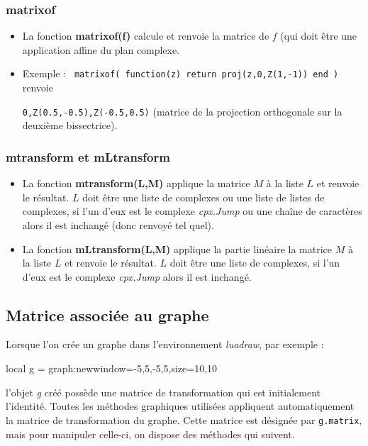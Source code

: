 \subsubsection{matrixof}
\begin{itemize}
    \item La fonction \textbf{matrixof(f)} calcule et renvoie la matrice de $f$ (qui doit être une application affine du plan complexe.
    \item Exemple : \texttt{ matrixof( function(z) return proj(z,{0,Z(1,-1)}) end )} renvoie \par
     \texttt{{0,Z(0.5,-0.5),Z(-0.5,0.5)}} (matrice de la projection orthogonale sur la deuxième bissectrice).
\end{itemize}

\subsubsection{mtransform et mLtransform}
\begin{itemize}
    \item La fonction \textbf{mtransform(L,M)} applique la matrice $M$ à la liste $L$ et renvoie le résultat. $L$ doit être une liste de complexes ou une liste de listes de complexes, si l'un d'eux est le complexe \emph{cpx.Jump} ou une chaîne de caractères alors il est inchangé (donc renvoyé tel quel).
    \item La fonction \textbf{mLtransform(L,M)} applique la partie linéaire la matrice $M$ à la liste $L$ et renvoie le résultat. $L$ doit être une liste de complexes, si l'un d'eux est le complexe \emph{cpx.Jump} alors il est inchangé.
\end{itemize}

\subsection{Matrice associée au graphe}

Lorsque l'on crée un graphe dans l'environnement \emph{luadraw}, par exemple :
\begin{Luacode}
local g = graph:new{window={-5,5,-5,5},size={10,10}}
\end{Luacode}
l'objet \emph{g} créé possède une matrice de transformation qui est initialement l'identité. Toutes les méthodes graphiques utilisées appliquent automatiquement la matrice de transformation du graphe. Cette matrice est désignée par \texttt{g.matrix}, mais pour manipuler celle-ci, on dispose des méthodes qui suivent.

